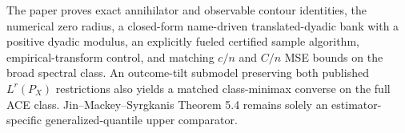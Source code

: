 The paper proves exact annihilator and observable contour identities, the numerical zero radius, a closed-form name-driven translated-dyadic bank with a positive dyadic modulus, an explicitly fueled certified sample algorithm, empirical-transform control, and matching \(c/n\) and \(C/n\) MSE bounds on the broad spectral class.  An outcome-tilt submodel preserving both published \(L^r(P_X)\) restrictions also yields a matched class-minimax converse on the full ACE class.  Jin--Mackey--Syrgkanis Theorem 5.4 remains solely an estimator-specific generalized-quantile upper comparator.